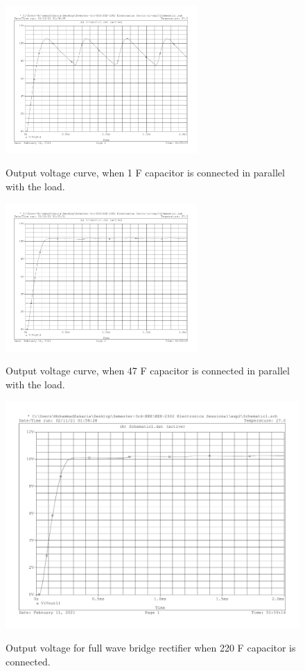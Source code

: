 \documentclass{article}
\begin{document}
	
	\begin{figure}[!htb]
	\begin{center}
		\includegraphics[width=0.65\textwidth]{Vout1-for-bride-fullwave-with-1ufd-capacitor.pdf} %
		\caption{} Output voltage curve, when 1 \textmu F capacitor is connected in parallel with the load.
	\end{center}
	\end{figure}



	\begin{figure}[!htb]
	\begin{center}
		\includegraphics[width=0.65\textwidth]{Vout1-for-bride-fullwave-with-47ufd-capacitor.pdf} %
		\caption{} Output voltage curve, when 47 \textmu F capacitor is connected in parallel with the load.
	\end{center}
	\end{figure}
	
	
	\begin{figure}[!htb]
		\centering
		\includegraphics[width=0.7\linewidth]{Vout1-for-bride-fullwave-with-220ufd-capacitor.pdf}
		\caption{}
		\label{fig:vout1} Output voltage for full wave bridge rectifier when 220 \textmu F capacitor is connected.
	\end{figure}

	
\end{document}
